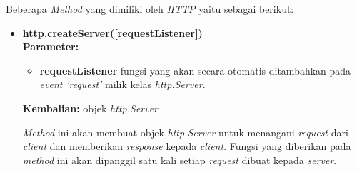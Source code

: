 Beberapa \textit{Method} yang dimiliki oleh \textit{HTTP} yaitu sebagai berikut:
\begin{itemize}
	\item \textbf{http.createServer([requestListener])} \\ \textbf{Parameter:}
	\begin{itemize}
		\item \textbf{requestListener} fungsi yang akan secara otomatis ditambahkan pada \textit{event} \textit{'request'} milik kelas \textit{http.Server}.
	\end{itemize}
	\textbf{Kembalian:} objek \textit{http.Server}
	
	\textit{Method} ini akan membuat objek \textit{http.Server} untuk menangani \textit{request} dari \textit{client} dan memberikan \textit{response} kepada \textit{client}. Fungsi yang diberikan pada \textit{method} ini akan dipanggil satu kali setiap \textit{request} dibuat kepada \textit{server}.
	

\end{itemize}
